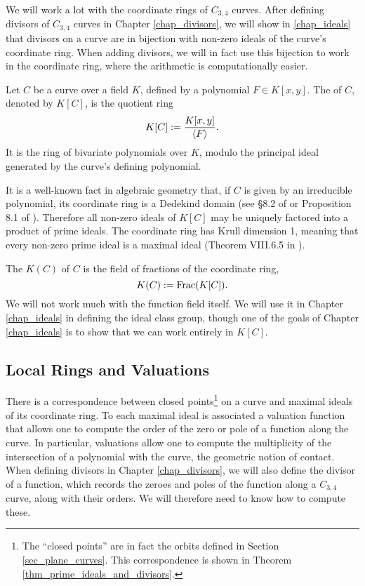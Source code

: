 We will work a lot with the coordinate rings of $C_{3,4}$ curves.
After defining divisors of $C_{3,4}$ curves in Chapter \ref{chap_divisors},
we will show in \ref{chap_ideals} that divisors on a curve
are in bijection with non-zero ideals of the curve's coordinate ring.
When adding divisors, we will in fact use this bijection to work in the coordinate ring,
where the arithmetic is computationally easier.

Let $C$ be a curve over a field $K$, defined by a polynomial $F \in K[x,y]$.
The  of $C$, denoted by $K[C]$, is the quotient ring
\[ K[C] := \frac {K[x,y]} {\left\langle F \right\rangle}. \]
It is the ring of bivariate polynomials over $K$,
modulo the principal ideal generated by the curve's defining polynomial.

It is a well-known fact in algebraic geometry that,
if $C$ is given by an irreducible polynomial,
its coordinate ring is a Dedekind domain (see \S 8.2 of \cite{galbraith12} or Proposition 8.1 of \cite{neukirch99}).
Therefore all non-zero ideals of $K[C]$ may be uniquely factored into a product of prime ideals.
The coordinate ring has Krull dimension 1, meaning that every non-zero prime ideal is a maximal ideal
(Theorem VIII.6.5 in \cite{hungerford}).

The  $K(C)$ of $C$ is the field of fractions of the coordinate ring,
\[ K(C) := \operatorname{Frac}(K[C]). \]
We will not work much with the function field itself.
We will use it in Chapter \ref{chap_ideals} in defining the ideal class group,
though one of the goals of Chapter \ref{chap_ideals} is to show that we can work entirely in $K[C]$.




\subsection{Local Rings and Valuations}
\label{sec_local_rings}

There is a correspondence between closed points\footnote{
The ``closed points'' are in fact the orbits defined in Section \ref{sec_plane_curves}.
This correspondence is shown in Theorem \ref{thm_prime_ideals_and_divisors}.}
on a curve and maximal ideals of its coordinate ring.
To each maximal ideal is associated a valuation function that allows one to compute the order of the zero or pole of a function along the curve.
In particular, valuations allow one to compute the multiplicity of the intersection of a polynomial with the curve, the geometric notion of contact.
When defining divisors in Chapter \ref{chap_divisors},
we will also define the divisor of a function,
which records the zeroes and poles of the function along a $C_{3,4}$ curve, along with their orders.
We will therefore need to know how to compute these.

